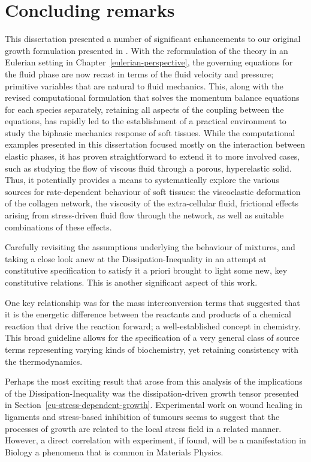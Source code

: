\chapter{Concluding remarks}
\label{conclusions}

\vspace{0.5cm} %

This dissertation presented a number of significant enhancements to
our original growth formulation presented in \citet{growthpaper}.
With the reformulation of the theory in an Eulerian setting in
Chapter~\ref{eulerian-perspective}, the governing equations for the
fluid phase are now recast in terms of the fluid velocity and
pressure; primitive variables that are natural to fluid
mechanics. This, along with the revised computational formulation that
solves the momentum balance equations for each species separately,
retaining all aspects of the coupling between the equations, has
rapidly led to the establishment of a practical environment to study
the biphasic mechanics response of soft tissues. While the
computational examples presented in this dissertation focused mostly
on the interaction between elastic phases, it has proven
straightforward to extend it to more involved cases, such as studying
the flow of viscous fluid through a porous, hyperelastic solid. Thus,
it potentially provides a means to systematically explore the various
sources for rate-dependent behaviour of soft tissues:  the
viscoelastic deformation of the collagen network, the viscosity of the
extra-cellular fluid, frictional effects arising from stress-driven
fluid flow through the network, as well as suitable combinations of
these effects.

Carefully revisiting the assumptions underlying the behaviour of
mixtures, and taking a close look anew at the Dissipation-Inequality
in an attempt at constitutive specification to satisfy it a priori
brought to light some new, key constitutive relations. This is another
significant aspect of this work.

One key relationship was for the mass interconversion terms that
suggested that it is the energetic difference between the reactants
and products of a chemical reaction that drive the reaction forward; a
well-established concept in chemistry. This broad guideline allows for
the specification of a very general class of source terms representing
varying kinds of biochemistry, yet retaining consistency with the
thermodynamics.

Perhaps the most exciting result that arose from this analysis
of the implications of the Dissipation-Inequality was the
dissipation-driven growth tensor presented in
Section~\ref{eu-stress-dependent-growth}. Experimental work on wound
healing in ligaments \citep{Provenzanoetal:2003} and stress-based 
inhibition of tumours \citep{jain1997} seems to suggest that the
processes of growth are related to the local stress field in a
related manner. However, a direct correlation with experiment, if
found, will be a manifestation in Biology a phenomena that is common in
Materials Physics.

%

